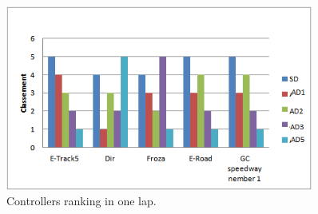 \documentclass{llncs}
\begin{document}
\begin{figure}[h!]
	
	\centering
	\includegraphics[width=0.9\textwidth]{fig/classement.png}
	\begin{minipage}{10cm}
		\centering
		\caption{\footnotesize Controllers ranking in one lap.}
		\label{clas}
	\end{minipage} 

\end{figure}
\end{document}
